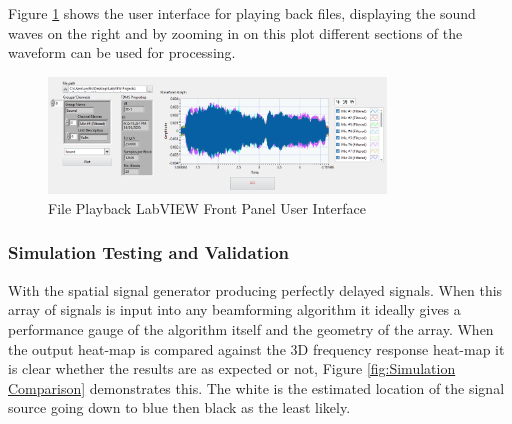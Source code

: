 \documentclass{UoNMCHA}
\numberwithin{equation}{section}
\begin{document}
Figure \ref{fig:FilePlaybackPanel} shows the user interface for playing back files, displaying the sound waves on the right and by zooming in on this plot different sections of the waveform can be used for processing.

    \begin{figure}[H]
        \centering
        \includegraphics[keepaspectratio, width = 0.8\textwidth]{Figures/FilePlaybackPanel.png}
        \caption{File Playback LabVIEW Front Panel User Interface}
        \label{fig:FilePlaybackPanel}
    \end{figure}  

\subsubsection{Simulation Testing and Validation} \label{sec:Sim Testing and Verification} 
    
   With the spatial signal generator producing perfectly delayed signals. When this array of signals is input into any beamforming algorithm it ideally gives a performance gauge of the algorithm itself and the geometry of the array. When the output heat-map is compared against the 3D frequency response heat-map it is clear whether the results are as expected or not, Figure \ref{fig:Simulation Comparison} demonstrates this. The white is the estimated location of the signal source going down to blue then black as the least likely.
    
\end{document}
